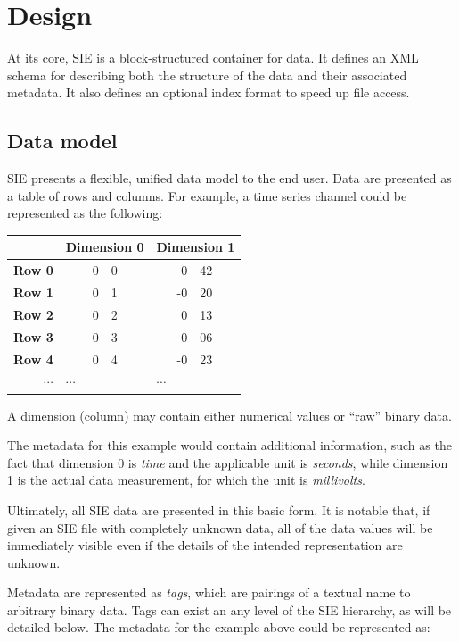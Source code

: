 \documentclass{article}
\begin{document}
\section{Design}

At its core, SIE is a block-structured container for data.  It defines
an XML \cite{xml} schema for describing both the structure of the data
and their associated metadata.  It also defines an optional index
format to speed up file access.

\subsection{Data model}
\label{data-model-sec}

SIE presents a flexible, unified data model to the end user.  Data are
presented as a table of rows and columns.  For example, a time series
channel could be represented as the following:

\begin{center}
  \begin{tabular}{r|r@{.}lr@{.}l}
    & \multicolumn{2}{l}{\textbf{Dimension 0}} & 
      \multicolumn{2}{l}{\textbf{Dimension 1}} \\ \hline
    \textbf{Row 0} & 0&0 &  0&42 \\
    \textbf{Row 1} & 0&1 & -0&20 \\
    \textbf{Row 2} & 0&2 &  0&13 \\
    \textbf{Row 3} & 0&3 &  0&06 \\
    \textbf{Row 4} & 0&4 & -0&23 \\
    $\cdots$ & \multicolumn{2}{l}{$\cdots$} & \multicolumn{2}{l}{$\cdots$}
  \end{tabular}
\end{center}

A dimension (column) may contain either numerical values or ``raw''
binary data.

The metadata for this example would contain additional information,
such as the fact that dimension 0 is \emph{time} and the applicable
unit is \emph{seconds}, while dimension 1 is the actual data
measurement, for which the unit is \emph{millivolts}.

Ultimately, all SIE data are presented in this basic form.  It is
notable that, if given an SIE file with completely unknown data, all
of the data values will be immediately visible even if the details of
the intended representation are unknown.

Metadata are represented as \emph{tags}, which are pairings of a
textual name to arbitrary binary data.  Tags can exist an any level of
the SIE hierarchy, as will be detailed below.  The metadata for the
example above could be represented as:
\end{document}

